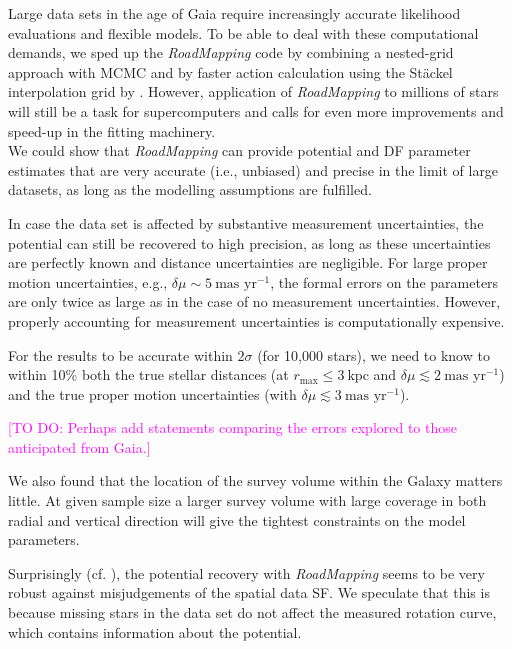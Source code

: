\documentclass[iop,revtex4]{emulateapj}
\newcommand{\RM}{{\sl RoadMapping}}
\newcommand{\Wilma}[1]{\textcolor{Magenta}{#1}}
\begin{document}
 Large data sets in the age of Gaia require increasingly accurate likelihood evaluations and flexible models. To be able to deal with these computational demands, we sped up the \RM{} code by combining a nested-grid approach with MCMC and by faster action calculation using the St\"{a}ckel \citep{2012MNRAS.426.1324B} interpolation grid by \citet{2015ApJS..216...29B}. However, application of \RM{} to millions of stars will still be a task for supercomputers and calls for even more improvements and speed-up in the fitting machinery.\\

 We could show that \RM{} can provide potential and DF parameter estimates that are very accurate (i.e., unbiased) and precise in the limit of large datasets, as long as the modelling assumptions are fulfilled.

In case the data set is affected by substantive measurement uncertainties, the potential can still be recovered to high precision, as long as these uncertainties are perfectly known and distance uncertainties are negligible. For large proper motion uncertainties, e.g., $\delta \mu \sim 5~\text{mas yr}^{-1}$, the formal errors on the parameters are only twice as large as in the case of no measurement uncertainties. However, properly accounting for measurement uncertainties is computationally expensive.

For the results to be accurate within $2\sigma$ (for 10,000 stars), we need to know to within 10\% both the true stellar distances (at $r_\text{max} \leq 3~\text{kpc}$ and $\delta \mu \lesssim 2 ~ \text{mas yr}^{-1}$) and the true proper motion uncertainties (with $\delta \mu \lesssim 3 ~ \text{mas yr}^{-1}$).

\Wilma{[TO DO: Perhaps add statements comparing the errors explored to those anticipated from Gaia.]}

We also found that the location of the survey volume within the Galaxy matters little. At given sample size a larger survey volume with large coverage in both radial and vertical direction will give the tightest constraints on the model parameters.

Surprisingly (cf. \citealt{2013A&ARv..21...61R}), the potential recovery with \RM{} seems to be very robust against misjudgements of the spatial data SF. We speculate that this is because missing stars in the data set do not affect the measured rotation curve, which contains information about the potential.
\end{document}
